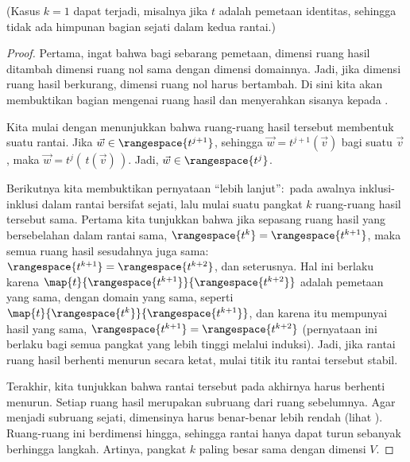 \noindent (Kasus $k=1$ dapat terjadi, misalnya jika $t$ adalah pemetaan
identitas, sehingga tidak ada himpunan bagian sejati dalam kedua rantai.)

\begin{proof}
Pertama, ingat bahwa bagi sebarang pemetaan, dimensi ruang hasil ditambah dimensi
ruang nol sama dengan dimensi domainnya.
Jadi, jika dimensi ruang hasil berkurang, dimensi ruang nol harus bertambah.
Di sini kita akan membuktikan bagian mengenai ruang hasil dan menyerahkan sisanya
kepada
.

Kita mulai dengan menunjukkan bahwa ruang-ruang hasil tersebut membentuk suatu
rantai.
Jika $\vec{w}\in\rangespace{t^{j+1}}$, sehingga
$\vec{w}=t^{j+1}(\vec{v})$ bagi suatu $\vec{v}$, maka
$\vec{w}=t^{j}(\,t(\vec{v})\,)$.
Jadi, $\vec{w}\in\rangespace{t^{j}}$.

Berikutnya kita membuktikan pernyataan ``lebih lanjut'':~pada awalnya
inklusi-inklusi dalam rantai bersifat sejati, lalu mulai suatu pangkat $k$
ruang-ruang hasil tersebut sama.
Pertama kita tunjukkan bahwa jika sepasang ruang hasil yang bersebelahan dalam
rantai sama, \( \rangespace{t^{k}}=\rangespace{t^{k+1}} \), maka semua ruang
hasil sesudahnya juga sama:
\( \rangespace{t^{k+1}}=\rangespace{t^{k+2}} \), dan seterusnya.
Hal ini berlaku karena
\( \map{t}{\rangespace{t^{k+1}}}{\rangespace{t^{k+2}}} \)
adalah pemetaan yang sama, dengan domain yang sama, seperti
\( \map{t}{\rangespace{t^{k}}}{\rangespace{t^{k+1}}} \), dan
karena itu mempunyai hasil yang sama,
\( \rangespace{t^{k+1}}=\rangespace{t^{k+2}} \)
(pernyataan ini berlaku bagi semua pangkat yang lebih tinggi melalui induksi).
Jadi, jika rantai ruang hasil berhenti menurun secara ketat, mulai titik itu
rantai tersebut stabil.

Terakhir, kita tunjukkan bahwa rantai tersebut pada akhirnya harus berhenti
menurun.
Setiap ruang hasil merupakan subruang dari ruang sebelumnya.
Agar menjadi subruang sejati, dimensinya harus benar-benar lebih rendah
(lihat ).
Ruang-ruang ini berdimensi hingga, sehingga rantai hanya dapat turun sebanyak
berhingga langkah.
Artinya, pangkat $k$ paling besar sama dengan dimensi $V$.
\end{proof}

